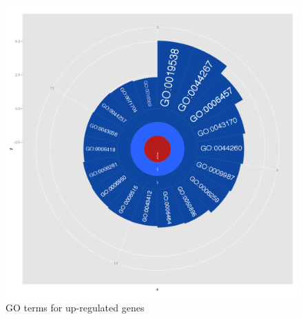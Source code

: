 \documentclass[12pt, a4paper]{report}
\begin{document}
\begin{figure}[H]
	\centering	
	\includegraphics[width=420pt]{pics/GO_Up2.png}
	\caption[GO terms for up-regulated genes]
	{GO terms for up-regulated genes}
	\label{fig:goup}
\end{figure}
\end{document}

